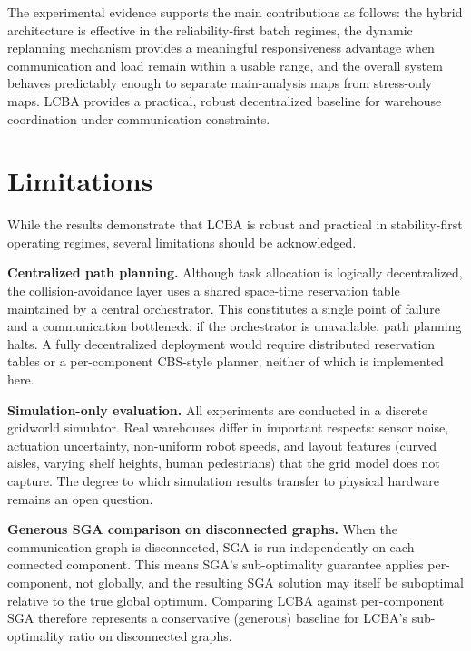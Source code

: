 
The experimental evidence supports the main contributions as follows: the
hybrid architecture is effective in the reliability-first batch regimes, the
dynamic replanning mechanism provides a meaningful responsiveness advantage
when communication and load remain within a usable range, and the overall
system behaves predictably enough to separate main-analysis maps from
stress-only maps. LCBA provides a practical, robust decentralized baseline for
warehouse coordination under communication constraints.


\section{Limitations}
\label{sec:conclusion_limitations}


While the results demonstrate that LCBA is robust and practical in
stability-first operating regimes, several limitations should be acknowledged.

\textbf{Centralized path planning.}
Although task allocation is logically decentralized, the collision-avoidance
layer uses a shared space-time reservation table maintained by a central
orchestrator.
This constitutes a single point of failure and a communication bottleneck:
if the orchestrator is unavailable, path planning halts.
A fully decentralized deployment would require distributed reservation tables
or a per-component CBS-style planner, neither of which is implemented here.

\textbf{Simulation-only evaluation.}
All experiments are conducted in a discrete gridworld simulator.
Real warehouses differ in important respects: sensor noise, actuation
uncertainty, non-uniform robot speeds, and layout features (curved aisles,
varying shelf heights, human pedestrians) that the grid model does not capture.
The degree to which simulation results transfer to physical hardware
remains an open question.

\textbf{Generous SGA comparison on disconnected graphs.}
When the communication graph is disconnected, SGA is run independently on
each connected component.
This means SGA's sub-optimality guarantee applies per-component, not globally,
and the resulting SGA solution may itself be suboptimal relative to the true
global optimum.
Comparing LCBA against per-component SGA therefore represents a conservative
(generous) baseline for LCBA's sub-optimality ratio on disconnected graphs.

